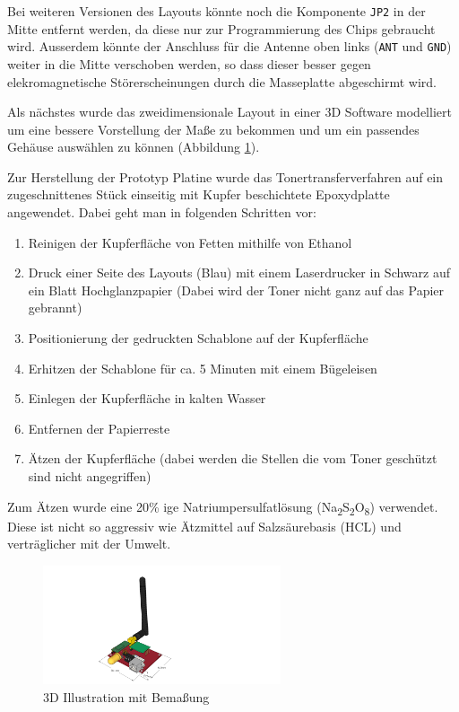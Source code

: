 \documentclass{report}
\begin{document}
Bei weiteren Versionen des Layouts könnte noch die Komponente \verb+JP2+ in der Mitte entfernt werden, da diese nur zur Programmierung des Chips gebraucht wird. Ausserdem könnte der Anschluss für die Antenne oben links (\verb+ANT+ und \verb+GND+) weiter in die Mitte verschoben werden, so dass dieser besser gegen elekromagnetische Störerscheinungen durch die Masseplatte abgeschirmt wird.

Als nächstes wurde das zweidimensionale Layout in einer 3D Software modelliert um eine bessere Vorstellung der Ma\ss e zu bekommen und um ein passendes Gehäuse auswählen zu können (Abbildung \ref{board3d}).

Zur Herstellung der Prototyp Platine wurde das Tonertransferverfahren auf ein zugeschnittenes Stück einseitig mit Kupfer beschichtete Epoxydplatte angewendet. Dabei geht man in folgenden Schritten vor:
\begin{enumerate}
    \item Reinigen der Kupferfläche von Fetten mithilfe von Ethanol
    \item Druck einer Seite des Layouts (Blau) mit einem Laserdrucker in Schwarz auf ein Blatt Hochglanzpapier (Dabei wird der Toner nicht ganz auf das Papier gebrannt)
    \item Positionierung der gedruckten Schablone auf der Kupferfläche
    \item Erhitzen der Schablone für ca. 5 Minuten mit einem Bügeleisen
    \item Einlegen der Kupferfläche in kalten Wasser
    \item Entfernen der Papierreste
    \item Ätzen der Kupferfläche (dabei werden die Stellen die vom Toner geschützt sind nicht angegriffen)
\end{enumerate}
Zum Ätzen wurde eine 20\% ige Natriumpersulfatlösung (Na\textsubscript{2}S\textsubscript{2}O\textsubscript{8}) verwendet. Diese ist nicht so aggressiv wie Ätzmittel auf Salzsäurebasis (HCL) und verträglicher mit der Umwelt.

\begin{figure}[!htbp]
    \begin{center}
        \includegraphics[width=7cm]{Bilder/board3d.pdf}
    \end{center}
    \caption{3D Illustration mit Bema\ss ung}
    \label{board3d}
\end{figure}
\end{document}
